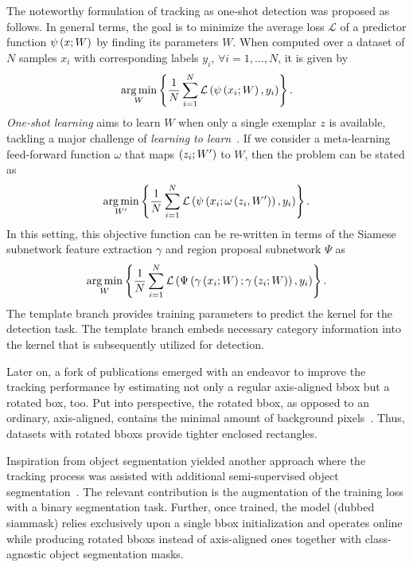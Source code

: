The noteworthy formulation of tracking as one-shot detection was proposed as follows. In general terms, the goal is to minimize the average loss $\mathcal{L}$ of a predictor function ${\psi} \left( x; W \right)$ by finding its parameters $W$. When computed over a dataset of $N$ samples $x_i$ with corresponding labels $y_i$, $\forall i = 1, \dots, N$, it is given by
\begin{equation}
    \label{eq:SiamRPNOneShotGeneral}
    \underset{W}{\operatorname*{arg\,min}}
    \left\{ {
        \frac{1}{N}
        \sum_{i = 1}^{N}
        {\mathcal{L}} \left( 
            {\psi} \left( x_i; W \right),
            y_i
         \right)
    } \right\}.
\end{equation}
\emph{One-shot learning} aims to learn $W$ when only a single exemplar $z$ is available, tackling a major challenge of \emph{learning to learn}~\cite{bertinetto2016oneshot}. If we consider a meta-learning feed-forward function $\omega$ that maps $\left( {z_i; W'} \right)$ to $W$, then the problem can be stated as
\begin{equation}
    \label{eq:SiamRPNOneShotMetaLearning}
    \underset{W'}{\operatorname*{arg\,min}}
    \left\{ {
        \frac{1}{N}
        \sum_{i = 1}^{N}
        {\mathcal{L}} \left( 
            {\psi} \left( x_i; {\omega} \left( z_i, W' \right) \right),
            y_i
         \right)
    } \right\}.
\end{equation}
In this setting, this objective function can be re-written in terms of the Siamese subnetwork feature extraction $\gamma$ and region proposal subnetwork $\Psi$ as
\begin{equation}
    \label{eq:SiamRPNOneShoCombo}
    \underset{W}{\operatorname*{arg\,min}}
    \left\{ {
        \frac{1}{N}
        \sum_{i = 1}^{N}
        {\mathcal{L}} \left( 
            {\Psi} \left( {\gamma} \left( x_i; W \right); {\gamma} \left( z_i; W \right) \right),
            y_i
         \right)
    } \right\}.
\end{equation}
The template branch provides training parameters to predict the kernel for the detection task. The template branch embeds necessary category information into the kernel that is subsequently utilized for detection.

Later on, a fork of publications emerged with an endeavor to improve the tracking performance by estimating not only a regular axis-aligned \gls{bbox} but a rotated box, too. Put into perspective, the rotated \gls{bbox}, as opposed to an ordinary, axis-aligned, contains the minimal amount of background pixels~\cite{chen2019rotbboxes}. Thus, datasets with rotated \glspl{bbox} provide tighter enclosed rectangles.

Inspiration from object segmentation yielded another approach where the tracking process was assisted with additional semi-supervised object segmentation~\cite{wang2019siammask}. The relevant contribution is the augmentation of the training loss with a binary segmentation task. Further, once trained, the model (dubbed \gls{siammask}) relies exclusively upon a single \gls{bbox} initialization and operates online while producing rotated \glspl{bbox} instead of axis-aligned ones together with class-agnostic object segmentation masks.

